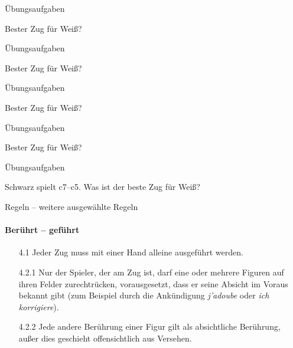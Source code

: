 \documentclass[
  aspectratio=1610,
]{beamer}
\begin{document}
\begin{frame}[<+->]{Übungsaufgaben}
  \begin{center}
    \chessboard[
      setfen=6nr/5Ppk/2r4p/7P/8/8/PP/K w - - 0 1, %
      moveid=1w,
    ]

    Bester Zug für Weiß?
  \end{center}
\end{frame}

\begin{frame}[<+->]{Übungsaufgaben}
  \begin{center}
    \chessboard[
      setfen=3k/8/8/8/8/8/1r/R3K w - - 0 1, %
      moveid=1w,
    ]

    Bester Zug für Weiß?
  \end{center}
\end{frame}

\begin{frame}[<+->]{Übungsaufgaben}
  \begin{center}
    \chessboard[
      setfen=8/ppp/1kn/8/KPP/8/8/8 w - - 0 1, %
      moveid=1w,
    ]

    Bester Zug für Weiß?
  \end{center}
\end{frame}

\begin{frame}[<+->]{Übungsaufgaben}
  \begin{center}
    \chessboard[
      setfen=8/3P1kp/2q2p/8/8/8/5PPP/6K w - - 0 1, %
      moveid=1w,
    ]

    Bester Zug für Weiß?
  \end{center}
\end{frame}

\begin{frame}[<+->]{Übungsaufgaben}
  \begin{center}
    \chessboard[
      setfen=1nb/k1pq/7p/PP/7K/2P2QP/3PB/8 w - - 0 1, %
      moveid=1w,
    ]

    Schwarz spielt c7–c5. Was ist der beste Zug für Weiß?
  \end{center}
\end{frame}

\begin{frame}[<+->]{Regeln – weitere ausgewählte Regeln}
  \framesubtitle{Berührt – geführt}
  \begin{itemize}
    \item[4.1] Jeder Zug muss mit einer Hand alleine ausgeführt werden.
    \item[4.2.1] Nur der Spieler, der am Zug ist, darf eine oder mehrere Figuren auf ihren
      Felder zurechtrücken, vorausgesetzt, dass er seine Absicht im Voraus bekannt gibt
      (zum Beispiel durch die Ankündigung \emph{j’adoube} oder \emph{ich korrigiere}).
    \item[4.2.2] Jede andere Berührung einer Figur gilt als absichtliche Berührung, außer
      dies geschieht offensichtlich aus Versehen.
  \end{itemize}
\end{frame}
\end{document}
